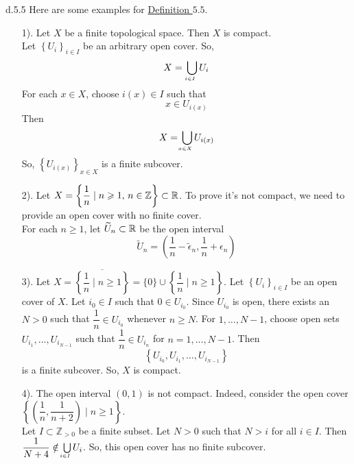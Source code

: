 \begin{customexa}{d.5.5} Here are some examples for \hypertarget{ex.d.5.5}{\hyperlink{Definition_5.5}{Definition $5.5$}}.
\begin{enumerate}
    \item[1).] Let $X$ be a finite topological space. Then $X$ is compact.\\
                Let $\left\{U_i\right\}_{i \in I}$ be an arbitrary open cover. So, 
                $$X = \underaccent{i \in I}{\bigcup} U_i $$
                For each $x \in X$, choose $i(x) \in I$ such that 
                $$x \in U_{i(x)}$$
                Then 
                $$X = \underaccent{x \in X}{\bigcup} U_{i(x)}$$
                So, $\left\{U_{i(x)}\right\}_{x\in X}$ is a finite subcover.
    \item[2).] Let $X =\left\{\dfrac{1}{n} \mid n \geqslant 1,\, n \in \mathbb{Z}\right\} \subset \mathbb{R}$. To prove it's not compact, we need to provide an open cover with no finite cover.\\
                For each $n \geqslant 1$, let $\widetilde{U}_n \subset \mathbb{R}$ be the open interval 
                $$\widetilde{U}_n = \left(\dfrac{1}{n} - \widetilde{\epsilon}_n, \dfrac{1}{n} + \epsilon_n\right)$$
    \item[3).] Let $X =\overline{\left\{\dfrac{1}{n} \mid n \geqslant 1\right\}} = \{0\} \cup \left\{\dfrac{1}{n} \mid n \geqslant 1\right\}$. Let $\left\{U_i\right\}_{i \in I}$ be an open cover of $X$. Let $i_0 \in I$ such that $0 \in U_{i_0}$. Since $U_{i_0}$ is open, there exists an $N > 0$ such that $\dfrac{1}{n} \in U_{i_0}$ whenever $n \geqslant N$. For $1, \dots , N-1$, choose open sets $U_{i_1}, \dots, U_{i_{N-1}}$ such that $\dfrac{1}{n} \in U_{i_n}$ for $n = 1, \dots, N -1$. Then 
    $$\left\{U_{i_0}, U_{i_1}, \dots, U_{i_{N-1}}\right\}$$
    is a finite subcover. So, $X$ is compact.
    \item[4).] The open interval $(0, 1)$ is not compact. Indeed, consider the open cover $\left\{\left(\dfrac{1}{n}, \dfrac{1}{n +2}\right)\mid n \geqslant 1\right\}$. \\
    Let $I \subset \mathbb{Z}_{> 0}$ be a finite subset. Let $N > 0$ such that $N > i$ for all $i \in I$. Then $\dfrac{1}{N + 4} \notin \underaccent{i \in I}{\bigcup} U_i$. So, this open cover has no finite subcover.
\end{enumerate}
\end{customexa}

